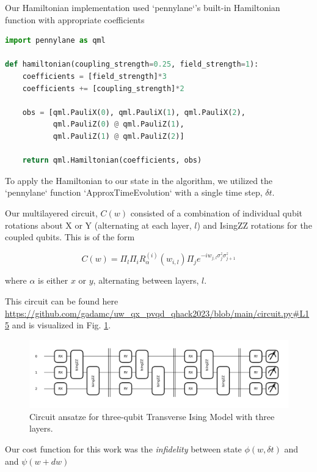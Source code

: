 \documentclass{article}
\begin{document}
Our Hamiltonian implementation used `pennylane`'s built-in Hamiltonian function with appropriate coefficients

\begin{lstlisting}[language=Python]
import pennylane as qml

def hamiltonian(coupling_strength=0.25, field_strength=1):
    coefficients = [field_strength]*3
    coefficients += [coupling_strength]*2

    obs = [qml.PauliX(0), qml.PauliX(1), qml.PauliX(2),
           qml.PauliZ(0) @ qml.PauliZ(1),
           qml.PauliZ(1) @ qml.PauliZ(2)]

    return qml.Hamiltonian(coefficients, obs)
\end{lstlisting}

To apply the Hamiltonian to our state in the algorithm, we utilized the `pennylane` function `ApproxTimeEvolution` with a single time step, $\delta t$.

Our multilayered circuit, $C(w)$ consisted of a combination of individual qubit rotations about X or Y (alternating at each layer, $l$) and IsingZZ rotations for the coupled qubits. This is of the form

\begin{equation}
    C(w) = \Pi_l \Pi_i R_{\alpha}^{(i)} (w_{i,l}) \Pi_j e^{-i w_{j,l} \sigma^z_j \sigma^z_{j+1}}
\end{equation}

where $\alpha$ is either $x$ or $y$, alternating between layers, $l$.

This circuit can be found here \url{https://github.com/gadamc/uw_qx_pvqd_qhack2023/blob/main/circuit.py#L15} and is visualized in Fig. \ref{circuit}.

\begin{figure}[!htb]
    \centering
        \includegraphics[width=5in]{circuit.png}
        \caption{Circuit ansatze for three-qubit Transverse Ising Model with three layers.}
        \label{circuit}
\end{figure}

Our cost function for this work was the \emph{infidelity} between state $\phi(w, \delta t)$ and and  $\psi(w + dw)$
\end{document}

